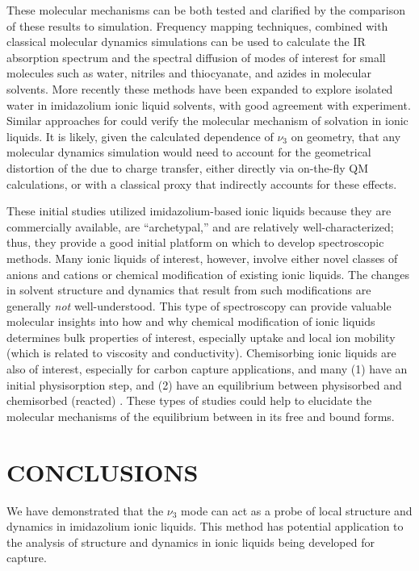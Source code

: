 These molecular mechanisms can be both tested and clarified by the comparison of these results to simulation. Frequency mapping techniques, combined with classical molecular dynamics simulations can be used to calculate the IR absorption spectrum and the spectral diffusion of modes of interest for small molecules such as water,\cite{steinelCPL-04,Asbury2004,Corcelli2004} nitriles and thiocyanate,\cite{Choi2008,Lindquist2008} and azides\cite{liJPC-06,Li2006} in molecular solvents. More recently these methods have been expanded to explore isolated water in imidazolium ionic liquid solvents\cite{Terranova2014b}, with good agreement with experiment.\cite{wongJPCB-13} Similar approaches for  could verify the molecular mechanism of  solvation in ionic liquids. It is likely, given the calculated dependence of $\nu_3$ on  geometry, that any molecular dynamics simulation would need to account for the geometrical distortion of the  due to charge transfer, either directly via on-the-fly QM calculations, or with a classical proxy that indirectly accounts for these effects.

These initial studies utilized imidazolium-based ionic liquids because they are commercially available, are ``archetypal,'' and are relatively well-characterized; thus, they provide a good initial platform on which to develop spectroscopic methods. Many ionic liquids of interest, however, involve either novel classes of anions and cations or chemical modification of existing ionic liquids. The changes in solvent structure and dynamics that result from such modifications are generally \textit{not} well-understood. This type of spectroscopy can provide valuable molecular insights into how and why chemical modification of ionic liquids determines bulk properties of interest, especially  uptake and local ion mobility (which is related to viscosity and conductivity). Chemisorbing ionic liquids are also of interest, especially for carbon capture applications, and many (1) have an initial physisorption step, and (2) have an equilibrium between physisorbed and chemisorbed (reacted) . These types of studies could help to elucidate the molecular mechanisms of the equilibrium between  in its free and bound forms.

\section{CONCLUSIONS}
\label{sec:anions_conclusions}
We have demonstrated that the  $\nu_3$ mode can act as a probe of local structure and dynamics in imidazolium ionic liquids. This method has potential application to the analysis of structure and dynamics in ionic liquids being developed for  capture.

